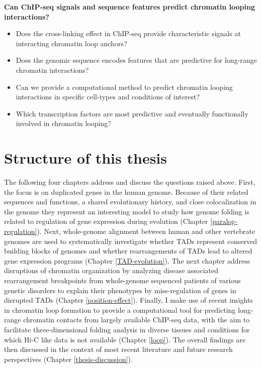 \documentclass[a4paper,twoside=true,openright,parskip=full,chapterprefix=true,11pt,headings=normal,bibliography=totoc,listof=totoc,titlepage=on,captions=tableabove,draft=false]{scrreprt}
\providecommand{\tightlist}{%
  \setlength{\itemsep}{0pt}\setlength{\parskip}{0pt}}
\theoremstyle{definition}
\theoremstyle{definition}
\theoremstyle{definition}
\theoremstyle{remark}
\begin{document}
\textbf{Can ChIP-seq signals and sequence features predict chromatin
looping interactions?}

\begin{itemize}
\tightlist
\item
  Does the cross-linking effect in ChIP-seq provide characteristic
  signals at interacting chromatin loop anchors?
\item
  Does the genomic sequence encodes features that are predictive for
  long-range chromatin interactions?
\item
  Can we provide a computational method to predict chromatin looping
  interactions in specific cell-types and conditions of interest?
\item
  Which transcription factors are most predictive and eventually
  functionally involved in chromatin looping?
\end{itemize}

\hypertarget{structure-of-this-thesis}{%
\section{Structure of this thesis}\label{structure-of-this-thesis}}

The following four chapters address and discuss the questions raised
above. First, the focus is on duplicated genes in the human genome.
Because of their related sequences and functions, a shared evolutionary
history, and close colocalization in the genome they represent an
interesting model to study how genome folding is related to regulation
of gene expression during evolution (Chapter \ref{paralog-regulation}).
Next, whole-genome alignment between human and other vertebrate genomes
are used to systematically investigate whether TADs represent conserved
building blocks of genomes and whether rearrangements of TADs lead to
altered gene expression programs (Chapter \ref{TAD-evolution}). The next
chapter address disruptions of chromatin organization by analyzing
disease associated rearrangement breakpoints from whole-genome sequenced
patients of various genetic disorders to explain their phenotypes by
miss-regulation of genes in disrupted TADs (Chapter
\ref{position-effect}). Finally, I make use of recent insights in
chromatin loop formation to provide a computational tool for predicting
long-range chromatin contacts from largely available ChIP-seq data, with
the aim to facilitate three-dimensional folding analysis in diverse
tissues and conditions for which Hi-C like data is not available
(Chapter \ref{loop}). The overall findings are then discussed in the
context of most recent literature and future research perspectives
(Chapter \ref{thesis-discussion}).
\end{document}
